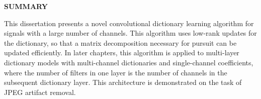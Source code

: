 \clearpage
\begin{centering}
\textbf{SUMMARY}\\
\vspace{\baselineskip}
\end{centering}

This dissertation presents a novel convolutional dictionary learning algorithm for signals with a large number of channels. This algorithm uses low-rank updates for the dictionary, so that a matrix decomposition necessary for pursuit can be updated efficiently. In later chapters, this algorithm is applied to multi-layer dictionary models with multi-channel dictionaries and single-channel coefficients, where the number of filters in one layer is the number of channels in the subsequent dictionary layer. This architecture is demonstrated on the task of JPEG artifact removal.


